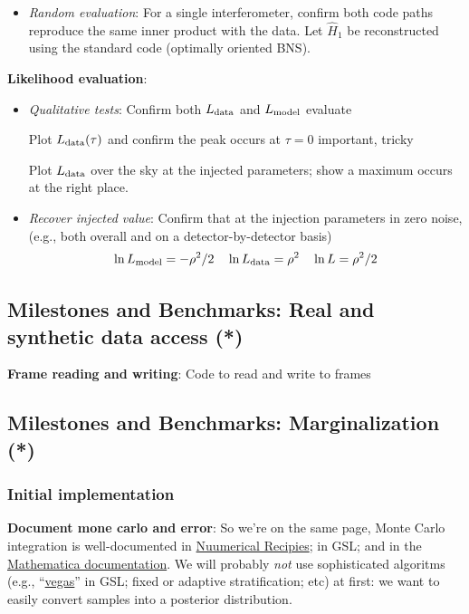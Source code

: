 \documentclass[twocolumn,prd,nofootinbib]{revtex4}
\newcommand\editremark[1]{{\color{red} #1}}
\begin{document}
\begin{widetext}
\begin{itemize}
\item \emph{Random evaluation}: For a single interferometer, confirm both code paths reproduce the same inner product
  with the data.   Let $\hat{H}_1$ be reconstructed using the standard code (optimally oriented BNS).
\end{itemize}

\noindent \textbf{Likelihood evaluation}:
\begin{itemize}
\item \emph{Qualitative tests}:  Confirm both $L_{\rm data}$ and $L_{\rm model}$ evaluate

Plot  $L_{\rm data}(\tau)$ and confirm the peak occurs at $\tau=0$ \editremark{important, tricky}

Plot $L_{\rm data}$ over the sky at the injected parameters; show a maximum occurs at the right place.

\item \emph{Recover injected value}: Confirm that at the injection parameters in zero noise, (e.g., both overall and on
  a detector-by-detector basis)
\[
\ln L_{\rm model}=-\rho^2/2 \quad 
\ln L_{\rm data} = \rho^2 \quad
\ln L = \rho^2/2
\]
\end{itemize}


\subsection{Milestones and Benchmarks: Real and synthetic data access (*)}

\noindent \textbf{Frame reading and writing}: Code to read and write to frames


\subsection{Milestones and Benchmarks: Marginalization (*)}

\subsubsection{Initial implementation}
\noindent \textbf{Document mone carlo and error}: So we're on the same page, Monte Carlo integration is well-documented in \href{http://nr.com}{Nuumerical Recipies}; in
GSL; and in the \href{http://reference.wolfram.com/mathematica/tutorial/NIntegrateIntegrationStrategies.html}{Mathematica documentation}.  We will probably \emph{not} use sophisticated algoritms (e.g.,
``\href{http://www.gnu.org/software/gsl/manual/html_node/VEGAS.html#VEGAS}{vegas}'' in GSL; fixed or adaptive stratification; etc) at first: we want to easily convert samples into a posterior distribution.



\end{widetext}
\end{document}
